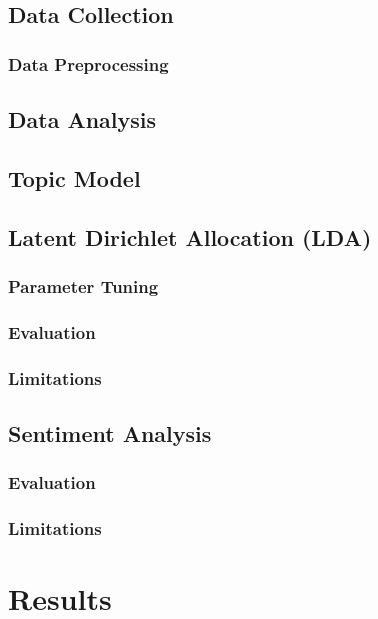 \documentclass[12pt,english,titlepage,a4paper]{article}
\begin{document}
\subsection{Data Collection}
\subsubsection{Data Preprocessing}

\subsection{Data Analysis}

\subsection{Topic Model}
\subsection{Latent Dirichlet Allocation (LDA)}
\subsubsection{Parameter Tuning}
\subsubsection{Evaluation}
\subsubsection{Limitations}

\subsection{Sentiment Analysis}
\subsubsection{Evaluation}
\subsubsection{Limitations}

\section{Results}
\end{document}
